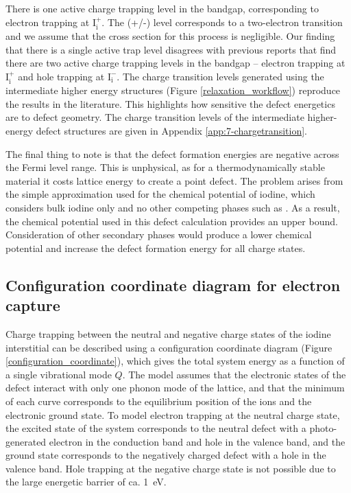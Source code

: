 There is one active charge trapping level in the bandgap, corresponding to electron trapping at $\mathrm{I}_\mathrm{i}^+$.  The (+/-) level corresponds to a two-electron transition and we assume that the cross section for this process is negligible. Our finding that there is a single active trap level disagrees with previous reports that find there are two active charge trapping levels in the bandgap -- electron trapping at $\mathrm{I}_\mathrm{i}^+$ and hole trapping at $\mathrm{I}_\mathrm{i}^-$.
The charge transition levels generated using the intermediate higher energy structures (Figure \ref{relaxation_workflow}) reproduce the results in the literature. This highlights how sensitive the defect energetics are to defect geometry. The charge transition levels of the intermediate higher-energy defect structures are given in Appendix \ref{app:7-chargetransition}.

The final thing to note is that the defect formation energies are negative across the Fermi level range. This is unphysical, as for a thermodynamically stable material it costs lattice energy to create a point defect. The problem arises from the simple approximation used for the chemical potential of iodine, which considers bulk iodine only and no other competing phases such as . As a result, the chemical potential used in this defect calculation provides an upper bound. Consideration of other secondary phases would produce a lower chemical potential and increase the defect formation energy for all charge states. 

\subsection{Configuration coordinate diagram for electron capture} \label{ch6:ccd}

Charge trapping between the neutral and negative charge states of the iodine interstitial can be described using a configuration coordinate diagram (Figure \ref{configuration_coordinate}), which gives the total system energy as a function of a single vibrational mode $Q$.\autocite{Alkauskas2016} 
The model assumes that the electronic states of the defect interact with only one phonon mode of the lattice, and that
the minimum of each curve corresponds to the equilibrium position of the ions and the electronic ground state. 
To model electron trapping at the neutral charge state, the excited state of the system corresponds to the neutral defect with a photo-generated electron in the conduction band and hole in the valence band, and the ground state corresponds to the negatively charged defect with a hole in the valence band.
Hole trapping at the negative charge state is not possible due to the large energetic barrier of ca. \SI{1}{\electronvolt}.

